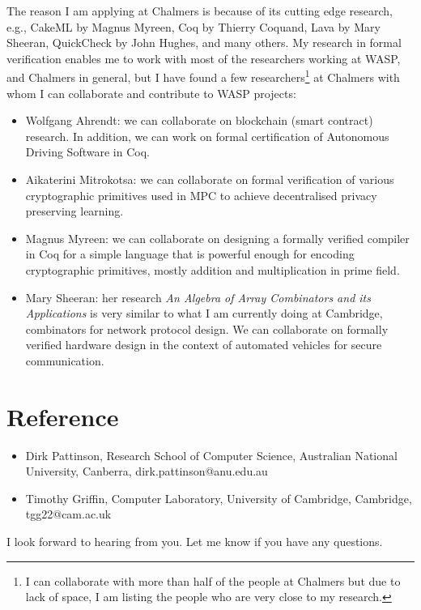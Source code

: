 \documentclass[11pt,a4paper,roman]{moderncv}
\begin{document}
The reason I am applying at Chalmers is because of its cutting edge research, 
e.g., CakeML by Magnus Myreen, Coq by Thierry Coquand, Lava by Mary Sheeran, 
QuickCheck by John Hughes, and many others. My research in formal verification 
enables me to work with most of the researchers working at WASP, and Chalmers in 
general, but I have found a few researchers\footnote{I can collaborate with 
more than half of the people at Chalmers but due to lack of space, I am listing the people who
are very close to my research.} at Chalmers with whom I can collaborate 
and contribute to WASP projects:
\begin{itemize}
  \item Wolfgang Ahrendt: we can collaborate on blockchain (smart contract) research.
    In addition, we can work on formal certification of Autonomous Driving Software in Coq. 
  \item Aikaterini Mitrokotsa: we can collaborate on formal verification of 
    various cryptographic primitives used in MPC to achieve decentralised
    privacy preserving learning.
  \item Magnus Myreen: we can collaborate on designing a formally verified 
    compiler in Coq for a simple language that is  powerful enough for encoding 
    cryptographic primitives, mostly addition and multiplication in prime field.
  \item Mary Sheeran: her research \textit{An Algebra of Array Combinators and its Applications}
   is very similar to what I am currently doing at Cambridge, combinators for 
   network protocol design. We can collaborate on formally verified hardware 
   design in the context of automated vehicles for secure communication.
    
\end{itemize}

\section{Reference}
\begin{itemize}
  \item Dirk Pattinson, Research School of Computer Science, Australian National University, Canberra, dirk.pattinson@anu.edu.au
  \item Timothy Griffin, Computer Laboratory,  University of Cambridge, Cambridge, tgg22@cam.ac.uk
\end{itemize}


\vspace{0.5cm}
I look forward to hearing from you. Let me know if you have any questions. \\
 

\vspace{0.5cm}


\makeletterclosing
\end{document}
